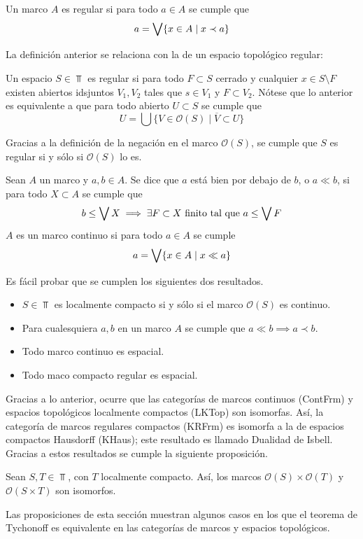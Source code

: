 \begin{definition}
Un marco $A$ es regular si para todo $a\in A$ se cumple que
$$a=\bigvee\{x\in A \mid x\prec a\}$$
\end{definition}
La definición anterior se relaciona con la de un espacio topológico regular:
\begin{definition}
    Un espacio $S\in\Top$ es regular si para todo $F\subset S$ cerrado
    y cualquier $x\in S\setminus F$ existen abiertos idsjuntos $V_1, V_2$ tales que $s\in V_1$ y $F\subset V_2$.
    Nótese que lo anterior es equivalente a que para todo abierto $U\subset S$ se cumple que
    $$U=\bigcup \{V \in \mathcal{O}(S) \mid \overline{V}\subset U\}$$
\end{definition}
Gracias a la definición de la negación en el marco $\mathcal{O}(S)$, se cumple que $S$ es regular si y sólo si $\mathcal{O}(S)$ lo es.
\begin{definition}
    Sean $A$ un marco y $a,b\in A$. Se dice que $a$ está bien por
    debajo de $b$, o $a\ll b$, si para todo $X\subset A$ se cumple que
    $$b\leq \bigvee X\implies \exists F\subset X \ \text{finito tal que} \ a\leq \bigvee F$$
    $A$ es un marco continuo si para todo $a\in A$ se cumple
    $$a=\bigvee\{x\in A\mid x\ll a\}$$
\end{definition}
Es fácil probar que se cumplen los siguientes dos resultados.
\begin{lemma}
\begin{itemize}
    \item $S\in\Top$ es localmente compacto si y sólo si el marco $\mathcal{O}(S)$ es continuo.
    \item Para cualesquiera $a,b$ en un marco $A$ se cumple que $a\ll b\implies a\prec b$.
    \item Todo marco continuo es espacial.
    \item Todo maco compacto regular es espacial.
\end{itemize}
\end{lemma}
Gracias a lo anterior, ocurre que las categorías de marcos continuos (ContFrm) y espacios topológicos localmente compactos (LKTop) son isomorfas. Así, la categoría de marcos regulares compactos (KRFrm) es isomorfa a la de espacios compactos Hausdorff (KHaus); este resultado es llamado Dualidad de Isbell.
Gracias a estos resultados se cumple la siguiente proposición.
\begin{proposition}
Sean $S,T\in\Top$, con $T$ localmente compacto. Así, los marcos $\mathcal{O}(S)\times \mathcal{O}(T)$ y $\mathcal{O}(S\times T)$ son isomorfos.
\end{proposition}
Las proposiciones de esta sección muestran algunos casos en los que el teorema de Tychonoff es equivalente en las categorías de marcos y espacios topológicos.

